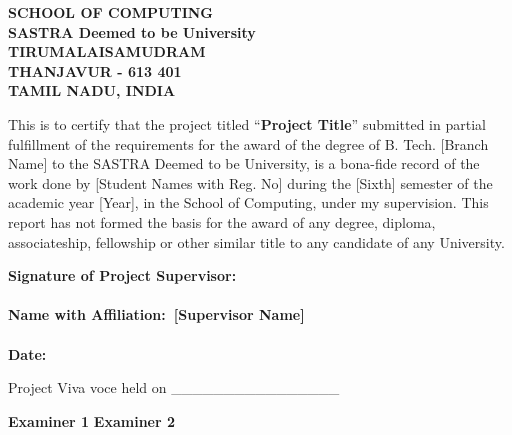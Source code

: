 \documentclass[a4paper, 12pt, oneside]{sastra_cse}
\begin{document}
	\begin{center}
		\Large{\textbf{SCHOOL OF COMPUTING}}\\
        \large{\textbf{SASTRA Deemed to be University}}\\
        \normalsize{\textbf{TIRUMALAISAMUDRAM}}\\
		\normalsize{\textbf{THANJAVUR - 613 401}}\\
        \normalsize{\textbf{TAMIL NADU, INDIA}}
	\end{center}
	
	
	
	\certificate
	
	\vspace*{0.1in}

	\begin{singlespace}
		
		This is to certify that the project titled ``\textbf{Project Title}'' submitted in partial fulfillment of the requirements for the award of the degree of B. Tech. [Branch Name] to the SASTRA Deemed to be University, is a bona-fide record of the work done by [Student Names with Reg. No] during the [Sixth] semester of the academic year [Year], in the School of Computing, under my supervision. This report has not formed the basis for the award of any degree, diploma, associateship, fellowship or other similar title to any candidate of any University.
		
	\end{singlespace}
	\vspace*{0.1in}
	
\noindent\textbf{Signature of Project Supervisor:}~	\\
\\
\textbf{Name with Affiliation\hspace*{19mm}:~\textbf{[Supervisor Name]}}	\\
\\
\textbf{Date\hspace*{48.25mm}:}\\
	
	\vspace*{0.1in}
	
	\noindent Project Viva voce held on \_\_\_\_\_\_\_\_\_\_\_\_\_\_\_\_ 
	
	\vspace*{0.1in}
	\noindent \textbf{Examiner 1} \hfill \textbf{Examiner 2}
	
\end{document}
